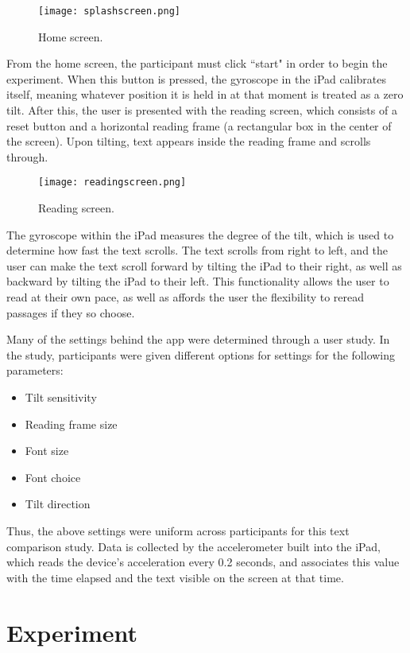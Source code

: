 \documentclass[11pt,letterpaper]{article}
\begin{document}
\begin{figure}[H]
\centering
\texttt{[image: splashscreen.png]}
\caption{Home screen.}
\end{figure}

From the home screen, the participant must click ``start" in order to begin the experiment. When this button is pressed, the gyroscope in the iPad calibrates itself, meaning whatever position it is held in at that moment is treated as a zero tilt. After this, the user is presented with the reading screen, which consists of a reset button and a horizontal reading frame (a rectangular box in the center of the screen). Upon tilting, text appears inside the reading frame and scrolls through. 

\begin{figure}[H]
\centering
\texttt{[image: readingscreen.png]}
\caption{Reading screen.}
\end{figure}

The gyroscope within the iPad measures the degree of the tilt, which is used to determine how fast the text scrolls. The text scrolls from right to left, and the user can make the text scroll forward by tilting the iPad to their right, as well as backward by tilting the iPad to their left. This functionality allows the user to read at their own pace, as well as affords the user the flexibility to reread passages if they so choose.

Many of the settings behind the app were determined through a user study. In the study, participants were given different options for settings for the following parameters:
\begin{itemize}[noitemsep, nolistsep]
\item Tilt sensitivity
\item Reading frame size
\item Font size
\item Font choice
\item Tilt direction
\end{itemize}

Thus, the above settings were uniform across participants for this text comparison study. Data is collected by the accelerometer built into the iPad, which reads the device's acceleration every 0.2 seconds, and associates this value with the time elapsed and the text visible on the screen at that time.

\section{Experiment}
\label{sec:exp}
\end{document}

